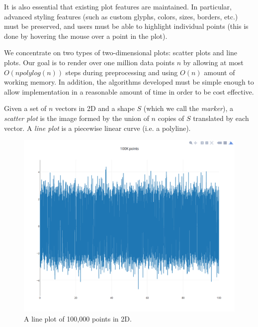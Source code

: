 \documentclass[11pt,a4paper]{article}
\begin{document}
It is also essential that existing plot features are maintained. 
In particular, advanced styling features (such as custom glyphs, colors, sizes, borders, etc.) must be preserved, 
and users must be able to highlight individual points (this is done by hovering the mouse over a point in the plot). 

We concentrate on two types of two-dimensional plots: scatter plots and line plots.  
Our goal is to render over one million data points $n$ by allowing at most $O(n polylog(n))$ steps during preprocessing 
and using $O(n)$ amount of working memory. 
In addition, the algorithms developed must be simple enough to allow implementation in a reasonable amount of time in order to be cost effective.


Given a set of $n$ vectors in 2D and a shape $S$ (which we call the \emph{marker}), 
a \emph{scatter plot} is the image formed by the union of $n$ copies of $S$ translated by each vector. 
A \emph{line plot} is a piecewise linear curve (i.e. a polyline).


\begin{figure}[hbt]
  \begin{center}
    \includegraphics[scale=0.2]{line.png}
    \caption{A line plot of 100,000 points in 2D.}
    \label{line}
  \end{center}
\end{figure}
\end{document}
